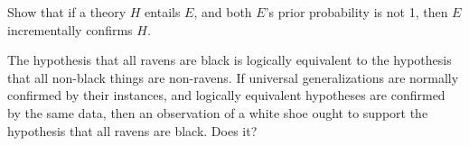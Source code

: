 
\begin{exercise}{1}
  Show that if a theory $H$ entails $E$, and both $E$'s prior probability is not
  1, then $E$ incrementally confirms $H$.
\end{exercise}

\begin{exercise}{3}
  The hypothesis that all ravens are black is logically equivalent to the
  hypothesis that all non-black things are non-ravens. If universal
  generalizations are normally confirmed by their instances, and logically
  equivalent hypotheses are confirmed by the same data, then an observation of a
  white shoe ought to support the hypothesis that all ravens are black. Does
  it?
\end{exercise}



